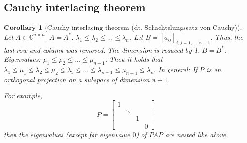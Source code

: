 \documentclass[a4paper]{article}
\newcounter{lecref}[section]
\numberwithin{lecref}{section}
\newtheorem{corollary}[lecref]{Corollary}
\begin{document}
\subsection{Cauchy interlacing theorem}

\begin{corollary}[Cauchy interlacing theorem (dt. \foreignlanguage{german}{Schachtelungssatz von Cauchy})] %
  Let $A \in \mathbb C^{n \times n}$, $A = A^*$. $\lambda_1 \leq \lambda_2 \leq \dots \leq \lambda_n$.
  Let $B = [a_{ij}]_{i,j=1,\dots,n-1}$. Thus, the last row and column was removed. The dimension is reduced by 1.
  $B = B^*$.
  Eigenvalues: $\mu_1 \leq \mu_2 \leq \dots \leq \mu_{n-1}$.
  Then it holds that $\lambda_1 \leq \mu_1 \leq \lambda_2 \leq \mu_2 \leq \lambda_3 \leq \dots \leq \lambda_{n-1} \leq \mu_{n-1} \leq \lambda_n$.
  In general: If $P$ is an orthogonal projection on a subspace of dimension $n-1$.

  For example,
  \[ P = \begin{bmatrix} 1 & & & \\ & \ddots & & \\ & & 1 & \\ & & & 0 \end{bmatrix} \]
  then the eigenvalues (except for eigenvalue $0$) of $PAP$ are nested like above.
\end{corollary}
\end{document}
